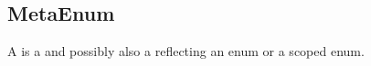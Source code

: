 \subsection{MetaEnum}
\label{concept-MetaEnum}

A  is a  and possibly also a 
reflecting an enum or a scoped enum.



